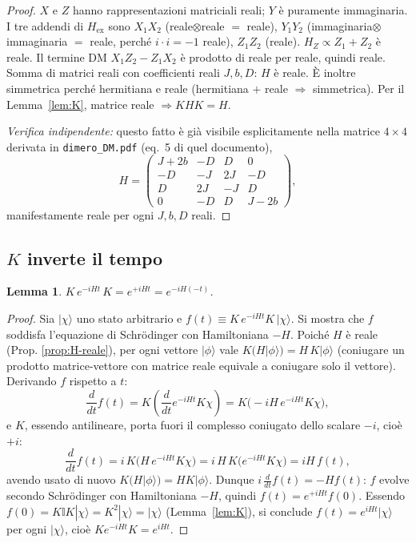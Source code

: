 \documentclass[11pt,a4paper]{article}
\newtheorem{lemma}{Lemma}
\begin{document}
\begin{proof}
$X$ e $Z$ hanno rappresentazioni matriciali reali; $Y$ è puramente immaginaria. I tre addendi di
$H_{\mathrm{ex}}$ sono $X_1X_2$ (reale$\otimes$reale $=$ reale), $Y_1Y_2$ (immaginaria$\otimes$immaginaria
$=$ reale, perché $i\cdot i=-1$ reale), $Z_1Z_2$ (reale). $H_Z\propto Z_1+Z_2$ è reale. Il
termine DM $X_1Z_2-Z_1X_2$ è prodotto di reale per reale, quindi reale. Somma di matrici reali
con coefficienti reali $J,b,D$: $H$ è reale. È inoltre simmetrica perché hermitiana e reale
(hermitiana $+$ reale $\Rightarrow$ simmetrica). Per il Lemma~\ref{lem:K}, matrice reale
$\Rightarrow KHK=H$.

\emph{Verifica indipendente:} questo fatto è già visibile esplicitamente nella matrice $4\times4$
derivata in \texttt{dimero\_DM.pdf} (eq.~5 di quel documento),
\begin{equation}
H = \begin{pmatrix}
J+2b & -D & D & 0 \\
-D & -J & 2J & -D \\
D & 2J & -J & D \\
0 & -D & D & J-2b
\end{pmatrix},
\end{equation}
manifestamente reale per ogni $J,b,D$ reali.
\end{proof}

\subsection{$K$ inverte il tempo}

\begin{lemma}
\label{lem:K-tempo}
$K\,e^{-iHt}\,K = e^{+iHt} = e^{-iH(-t)}$.
\end{lemma}

\begin{proof}
Sia $|\chi\rangle$ uno stato arbitrario e $f(t)\equiv K\,e^{-iHt}K\,|\chi\rangle$. Si mostra che
$f$ soddisfa l'equazione di Schrödinger con Hamiltoniana $-H$. Poiché $H$ è reale (Prop.
\ref{prop:H-reale}), per ogni vettore $|\phi\rangle$ vale $K(H|\phi\rangle) = H\,K|\phi\rangle$
(coniugare un prodotto matrice-vettore con matrice reale equivale a coniugare solo il vettore).
Derivando $f$ rispetto a $t$:
\begin{equation}
\frac{d}{dt}f(t) = K\left(\frac{d}{dt}e^{-iHt}K\chi\right)
= K\big(-iH\,e^{-iHt}K\chi\big),
\end{equation}
e $K$, essendo antilineare, porta fuori il complesso coniugato dello scalare $-i$, cioè $+i$:
\begin{equation}
\frac{d}{dt}f(t) = i\,K\big(H\,e^{-iHt}K\chi\big) = i\,H\,K\big(e^{-iHt}K\chi\big) = iH\,f(t),
\end{equation}
avendo usato di nuovo $K(H|\phi\rangle)=HK|\phi\rangle$. Dunque $i\,\frac{d}{dt}f(t) = -H f(t)$:
$f$ evolve secondo Schrödinger con Hamiltoniana $-H$, quindi $f(t)=e^{+iHt}f(0)$. Essendo
$f(0)=K\mathbb I K|\chi\rangle=K^2|\chi\rangle=|\chi\rangle$ (Lemma~\ref{lem:K}), si conclude
$f(t)=e^{iHt}|\chi\rangle$ per ogni $|\chi\rangle$, cioè $Ke^{-iHt}K=e^{iHt}$.
\end{proof}
\end{document}
